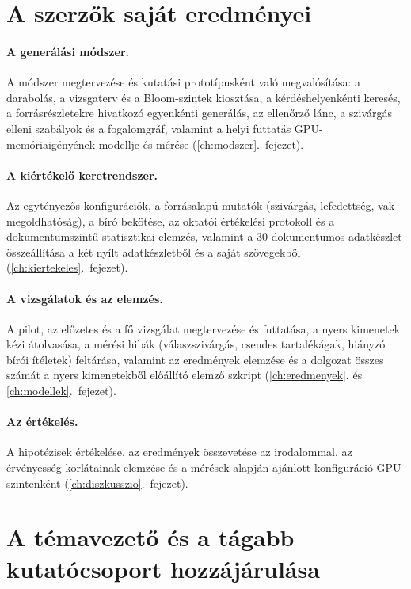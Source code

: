 \section{A szerzők saját eredményei}

\paragraph{A generálási módszer.} A \Mimir{} módszer megtervezése és kutatási prototípusként való
megvalósítása: a darabolás, a vizsgaterv és a Bloom-szintek kiosztása, a kérdéshelyenkénti keresés, a
forrásrészletekre hivatkozó egyenkénti generálás, az ellenőrző lánc, a szivárgás elleni szabályok és a
fogalomgráf, valamint a helyi futtatás GPU-memóriaigényének modellje és mérése (\ref{ch:modszer}.~fejezet).

\paragraph{A kiértékelő keretrendszer.} Az egytényezős konfigurációk, a forrásalapú mutatók (szivárgás,
lefedettség, vak megoldhatóság), a bíró bekötése, az oktatói értékelési protokoll és a dokumentumszintű
statisztikai elemzés, valamint a 30 dokumentumos adatkészlet összeállítása a két nyílt adatkészletből és a saját
szövegekből (\ref{ch:kiertekeles}.~fejezet). 

\paragraph{A vizsgálatok és az elemzés.} A pilot, az előzetes és a fő vizsgálat megtervezése és futtatása, a
nyers kimenetek kézi átolvasása, a mérési hibák (válaszszivárgás, csendes tartalékágak, hiányzó bírói
ítéletek) feltárása, valamint az eredmények elemzése és a dolgozat összes számát a nyers kimenetekből
előállító elemző szkript (\ref{ch:eredmenyek}. és \ref{ch:modellek}.~fejezet). 

\paragraph{Az értékelés.} A hipotézisek értékelése, az eredmények összevetése az irodalommal, az érvényesség
korlátainak elemzése és a mérések alapján ajánlott konfiguráció GPU-szintenként (\ref{ch:diszkusszio}.~fejezet).

\section{A témavezető és a tágabb kutatócsoport hozzájárulása}

